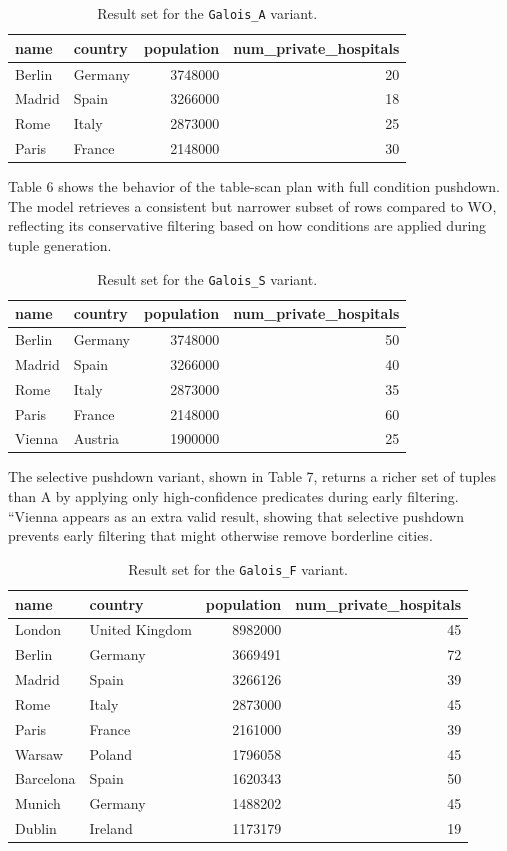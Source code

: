 \documentclass[12pt]{article}
\begin{document}
\begin{table}[H]
\centering
\begin{tabular}{l l r r}
\hline
name & country & population & num\_private\_hospitals \\
\hline
Berlin & Germany & 3748000 & 20 \\
Madrid & Spain & 3266000 & 18 \\
Rome & Italy & 2873000 & 25 \\
Paris & France & 2148000 & 30 \\
\hline
\end{tabular}
\caption{Result set for the \texttt{Galois\_A} variant.}
\end{table}

Table 6 shows the behavior of the table-scan plan with full condition pushdown. The model retrieves a consistent but narrower subset of rows compared to WO, reflecting its conservative filtering based on how conditions are applied during tuple generation.


\begin{table}[H]
\centering
\begin{tabular}{l l r r}
\hline
name & country & population & num\_private\_hospitals \\
\hline
Berlin & Germany & 3748000 & 50 \\
Madrid & Spain & 3266000 & 40 \\
Rome & Italy & 2873000 & 35 \\
Paris & France & 2148000 & 60 \\
Vienna & Austria & 1900000 & 25 \\
\hline
\end{tabular}
\caption{Result set for the \texttt{Galois\_S} variant.}
\end{table}

The selective pushdown variant, shown in Table 7, returns a richer set of tuples than A by applying only high-confidence predicates during early filtering. “Vienna appears as an extra valid result, showing that selective pushdown prevents early filtering that might otherwise remove borderline cities.

\begin{table}[H]
\centering
\begin{tabular}{l l r r}
\hline
name & country & population & num\_private\_hospitals \\
\hline
London & United Kingdom & 8982000 & 45 \\
Berlin & Germany & 3669491 & 72 \\
Madrid & Spain & 3266126 & 39 \\
Rome & Italy & 2873000 & 45 \\
Paris & France & 2161000 & 39 \\
Warsaw & Poland & 1796058 & 45 \\
Barcelona & Spain & 1620343 & 50 \\
Munich & Germany & 1488202 & 45 \\
Dublin & Ireland & 1173179 & 19 \\
\hline
\end{tabular}
\caption{Result set for the \texttt{Galois\_F} variant.}
\end{table}
\end{document}
